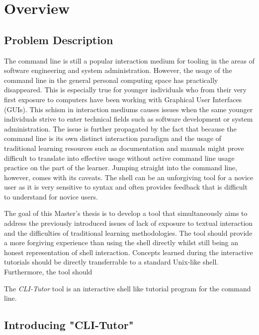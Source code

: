 \chapter{Overview}
\section{Problem Description}

The command line is still a popular interaction medium for tooling in the areas
of software engineering and system administration. However, the usage of the
command line in the general personal computing space has practically
disappeared. This is especially true for younger individuals who from their
very first exposure to computers have been working with Graphical User
Interfaces (GUIs). This schism in interaction mediums causes issues when the
same younger individuals strive to enter technical fields such as software
development or system administration. The issue is further propagated by the
fact that because the command line is its own distinct interaction paradigm and
the usage of traditional learning resources such as documentation and manuals
might prove difficult to translate into effective usage without active command
line usage practice on the part of the learner. Jumping straight into the
command line, however, comes with its caveats. The shell can be an unforgiving
tool for a novice user as it is very sensitive to syntax and often provides
feedback that is difficult to understand for novice users.

The goal of this Master's thesis is to develop a tool that simultaneously aims
to address the previously introduced issues of lack of exposure to textual
interaction and the difficulties of traditional learning methodologies. The
tool should provide a more forgiving experience than using the shell directly
whilst still being an honest representation of shell interaction. Concepts
learned during the interactive tutorials should be directly transferrable to a
standard Unix-like shell. Furthermore, the tool should 

The \textit{CLI-Tutor} tool is an interactive shell like tutorial program for
the command line.

%

\section{Introducing "CLI-Tutor"}

